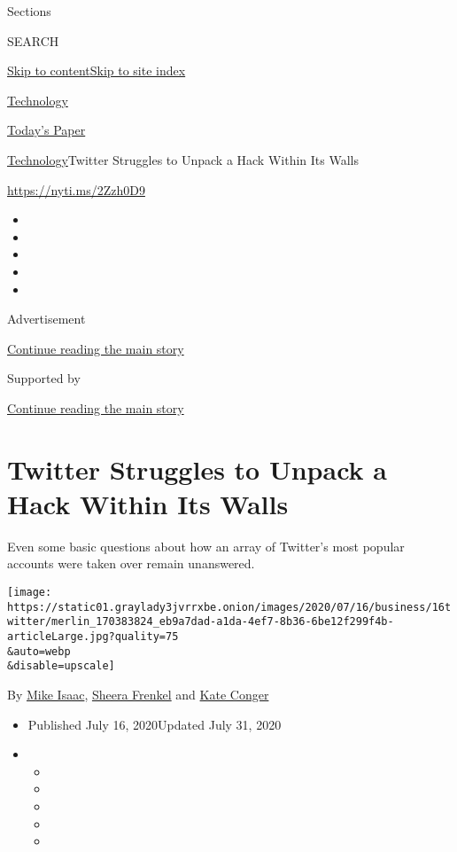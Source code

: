 Sections

SEARCH

\protect\hyperlink{site-content}{Skip to
content}\protect\hyperlink{site-index}{Skip to site index}

\href{https://www.nytimes3xbfgragh.onion/section/technology}{Technology}

\href{https://myaccount.nytimes3xbfgragh.onion/auth/login?response_type=cookie\&client_id=vi}{}

\href{https://www.nytimes3xbfgragh.onion/section/todayspaper}{Today's
Paper}

\href{/section/technology}{Technology}\textbar{}Twitter Struggles to
Unpack a Hack Within Its Walls

\url{https://nyti.ms/2Zzh0D9}

\begin{itemize}
\item
\item
\item
\item
\item
\end{itemize}

Advertisement

\protect\hyperlink{after-top}{Continue reading the main story}

Supported by

\protect\hyperlink{after-sponsor}{Continue reading the main story}

\hypertarget{twitter-struggles-to-unpack-a-hack-within-its-walls}{%
\section{Twitter Struggles to Unpack a Hack Within Its
Walls}\label{twitter-struggles-to-unpack-a-hack-within-its-walls}}

Even some basic questions about how an array of Twitter's most popular
accounts were taken over remain unanswered.

\texttt{[image: https://static01.graylady3jvrrxbe.onion/images/2020/07/16/business/16twitter/merlin\_170383824\_eb9a7dad-a1da-4ef7-8b36-6be12f299f4b-articleLarge.jpg?quality=75\\\&auto=webp\\\&disable=upscale]}

By \href{https://www.nytimes3xbfgragh.onion/by/mike-isaac}{Mike Isaac},
\href{https://www.nytimes3xbfgragh.onion/by/sheera-frenkel}{Sheera
Frenkel} and
\href{https://www.nytimes3xbfgragh.onion/by/kate-conger}{Kate Conger}

\begin{itemize}
\item
  Published July 16, 2020Updated July 31, 2020
\item
  \begin{itemize}
  \item
  \item
  \item
  \item
  \item
  \end{itemize}
\end{itemize}

